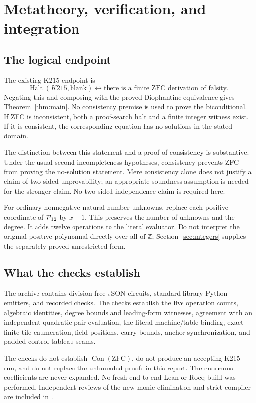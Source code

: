 \documentclass[11pt,letterpaper]{article}
\theoremstyle{remark}\newtheorem{remark}[theorem]{Remark}
\newcommand{\Z}{\mathbb Z}\newcommand{\N}{\mathbb N}\newcommand{\pos}{\mathbb Z_{>0}}
\newcommand{\Con}{\operatorname{Con}}\newcommand{\Res}{\operatorname{Res}}
\newcommand{\pathtext}[1]{\texttt{\detokenize{#1}}}
\begin{document}
\section{Metatheory, verification, and integration}\label{sec:verification}

\subsection{The logical endpoint}
The existing K215 endpoint is
\[
 \operatorname{Halt}(K215,\mathrm{blank})
 \longleftrightarrow
 \text{there is a finite ZFC derivation of falsity}.
\]
Negating this and composing with the proved Diophantine equivalence gives
Theorem~\ref{thm:main}. No consistency premise is used to prove the
biconditional. If ZFC is inconsistent, both a proof-search halt and a finite
integer witness exist. If it is consistent, the corresponding equation has
no solutions in the stated domain.

The distinction between this statement and a proof of consistency is
substantive. Under the usual second-incompleteness hypotheses, consistency
prevents ZFC from proving the no-solution statement. Mere consistency alone
does not justify a claim of two-sided unprovability; an appropriate soundness
assumption is needed for the stronger claim. No two-sided independence claim
is required here.

For ordinary nonnegative natural-number unknowns, replace each positive
coordinate of $\mathcal P_{12}$ by $x+1$. This preserves the number of unknowns
and the degree. It adds twelve operations to the literal evaluator. Do not
interpret the original positive polynomial directly over all of $\Z$;
Section~\ref{sec:integers} supplies the separately proved unrestricted form.

\subsection{What the checks establish}
The archive contains division-free JSON circuits, standard-library Python
emitters, and recorded checks. The checks establish the live operation counts,
algebraic identities, degree bounds and leading-form witnesses, agreement
with an independent quadratic-pair evaluation, the literal machine/table
binding, exact finite tile enumeration, field positions, carry bounds,
anchor synchronization, and padded control-tableau seams.

The checks do not establish $\Con(\mathrm{ZFC})$, do not produce an accepting
K215 run, and do not replace the unbounded proofs in this report. The
enormous coefficients are never expanded. No fresh end-to-end Lean or Rocq
build was performed. Independent reviews of the new monic elimination and
strict compiler are included in \pathtext{proofs/}.
\end{document}
